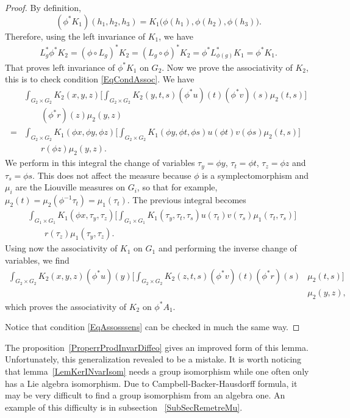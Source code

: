 \begin{proof}
By definition,
\[
(\phi^*K_1)(h_1,h_2,h_3)=K_1\big( \phi(h_1),\phi(h_2),\phi(h_3)\big).
\]
Therefore, using the left invariance of $K_1$, we have
\[
\begin{split}
    L_{g}^*\phi^*K_2=(\phi\circ L_{g})^*K_2=(L_{g}\circ\phi)^*K_2=\phi^*L_{\phi(g)}^*K_1=\phi^*K_1.
\end{split}
\]
That proves left invariance of $\phi^*K_1$ on $G_{2}$.  Now we prove the associativity of $K_2$, this is to check condition  \eqref{EqCondAssoc}. We have
\[
\begin{split}
 &\int_{G_2\times G_2}K_2(x,y,z)\Bigg[ \int_{G_2\times G_2}K_2(y,t,s)(\phi^*u)(t)(\phi^*v)(s)\mu_2(t,s) \Bigg]\\
&\qquad(\phi^*r)(z)\mu_2(y,z)\\
=&\int_{G_2\times G_2}K_1(\phi x,\phi y,\phi z)\Bigg[  \int_{G_2\times G_2}K_1(\phi y,\phi t,\phi s)u(\phi t)v(\phi s)\mu_2(t,s)  \Bigg]\\
&\qquad r(\phi z)\mu_2(y,z).
\end{split}
\]
We perform in this integral the change of variables $\tau_y=\phi y$, $\tau_t=\phi t$, $\tau_z=\phi z$ and $\tau_s=\phi s$. This does not affect the measure because  $\phi$ is a symplectomorphism and $\mu_i$ are the Liouville measures on $G_i$, so that for example,  $\mu_2(t)=\mu_2(\phi^{-1}\tau_t)=\mu_1(\tau_t)$. The previous integral becomes
\[
\begin{split}
  &\int_{G_1\times G_1}K_1(\phi x,\tau_y,\tau_z)\Bigg[  \int_{G_1\times G_1}K_1(\tau_y,\tau_t,\tau_s)u(\tau_t)v(\tau_s)\mu_1(\tau_t,\tau_s)  \Bigg]\\
&\qquad r(\tau_z)\mu_1(\tau_y,\tau_z).
\end{split}
\]
Using now the associativity of $K_1$ on $G_1$ and performing the inverse change of variables, we find
\[
\begin{split}
\int_{G_2\times G_2}K_2(x,y,z)(\phi^*u)(y)\Bigg[ \int_{G_2\times G_2}K_2(z,t,s)(\phi^*v)(t)(\phi^*r)(s)&\mu_2(t,s)   \Bigg]\\
                    &\mu_2(y,z),
\end{split}
\]
which proves the associativity of $K_2$ on $\phi^*A_1$.

Notice that condition \eqref{EqAssosssens} can be checked in much the same way.

\end{proof}

The proposition~\ref{ProperrProdInvarDiffeo} gives an improved form of this lemma. Unfortunately, this generalization revealed to be a mistake. It is worth noticing that lemma~\ref{LemKerINvarIsom} needs a group isomorphism while one often only has a Lie algebra isomorphism. Due to Campbell-Backer-Hausdorff formula, it may be very difficult to find a group isomorphism from an algebra one. An example of this difficulty is in subsection ~\ref{SubSecRemetreMu}.


